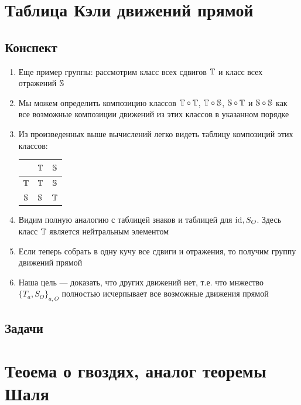 \section{Таблица Кэли движений прямой}

\subsection{Конспект}
\begin{enumerate}\setlength{\itemsep}{1pt}
\item Еще пример группы: рассмотрим класс всех сдвигов $\T$ и класс всех отражений $\S$
\item Мы можем определить композицию классов $\T\circ \T$, $\T\circ \S$, $\S\circ \T$ и $\S\circ \S$ как все возможные композиции движений из этих классов в указанном порядке
\item Из произведенных выше вычислений легко видеть таблицу композиций этих классов:
\begin{table}[htb!]\begin{center}
\begin{tabular}{c|c|c|}
  & $\T$ & $\S$ \\
 \hline
$\T$ & $\T$ & $\S$ \\
 \hline
$\S$ & $\S$ & $\T$ \\
\hline
\end{tabular}
\end{center}\end{table}
\item Видим полную аналогию с таблицей знаков и таблицей для $\id, S_O$. Здесь класс $\T$ является нейтральным элементом
\item Если теперь собрать в одну кучу все сдвиги и отражения, то получим группу движений прямой
\item Наша цель --- доказать, что других движений нет, т.е. что мнжество $\{T_a,S_O\}_{a,O}$ полностью исчерпывает все возможные движения прямой
\end{enumerate}
\subsection{Задачи}



\section{Теоема о гвоздях, аналог теоремы Шаля}

